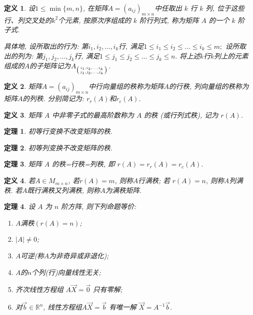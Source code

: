 \documentclass[a4paper]{book}
\newtheorem{Def}{定义}[chapter]
\newtheorem{thm}{定理}[chapter]
\begin{document}
\begin{Def}
设$1\leq \min\{m,n\}$, 在矩阵$A=(a_{ij})_{m\times n}$中任取出 $k$ 行 $k$ 列, 位于这些行、列交叉处的$k^2$个元素, 按原次序组成的 $k$ 阶行列式, 称为矩阵 $A$ 的一个 $k$ 阶子式.

具体地, 设所取出的行为: 第$i_1,i_2,\dots,i_k$行, 满足$1\leq i_1\leq i_2\leq \dots\leq i_k\leq m;$ 设所取出的列为: 第$j_1,j_2,\dots,j_k$行, 满足$1\leq j_1\leq j_2\leq \dots\leq j_k\leq n.$ 将上述$k$行$k$列上的元素组成的$A$的子矩阵记为$A_{\left( i_1,i_2,\dots,i_k \atop j_1,j_2,\dots,j_k  \right)}$.
\end{Def}

\begin{Def}
矩阵$A=(a_{ij})_{m\times n}$中行向量组的秩称为矩阵$A$的行秩, 列向量组的秩称为矩阵$A$的列秩. 分别简记为: $r_r(A)$和$r_c(A)$.

\end{Def}

\begin{Def}
矩阵 $A$ 中非零子式的最高阶数称为 $A$ 的秩 (或行列式秩),  记为 $r(A)$.
\end{Def}

\begin{thm}
初等行变换不改变矩阵的秩.
\end{thm}

\begin{thm}
初等列变换不改变矩阵的秩.
\end{thm}

\begin{thm}
矩阵 $A$ 的秩=行秩=列秩, 即 $r(A) =r_r(A) =r_c(A)$.

\end{thm}

\begin{Def}
若$A\in M_{m\times n}$, 若$r(A)=m$, 则称$A$行满秩; 若 $r(A) = n$, 则称A列满秩. 若$A$既行满秩又列满秩, 则称$A$为满秩矩阵.

\end{Def}


\begin{thm}
设 $A$ 为 $n$ 阶方阵, 则下列命题等价:
\begin{enumerate}
\item $A$满秩$(r(A)=n)$;
\item $|A|\not=0$;
\item $A$可逆(称$A$为非奇异或非退化);
\item $A$的$n$个列(行)向量线性无关;
\item 齐次线性方程组 $A\vec{X}=\vec{0}$ 只有零解;
\item 对$\vec{b}\in \mathbb{R}^n$, 线性方程组$A\vec{X}=\vec{b}$ 有唯一解 $\vec{X}=A^{-1}\vec{b}$.
\end{enumerate}

\end{thm}
\end{document}
